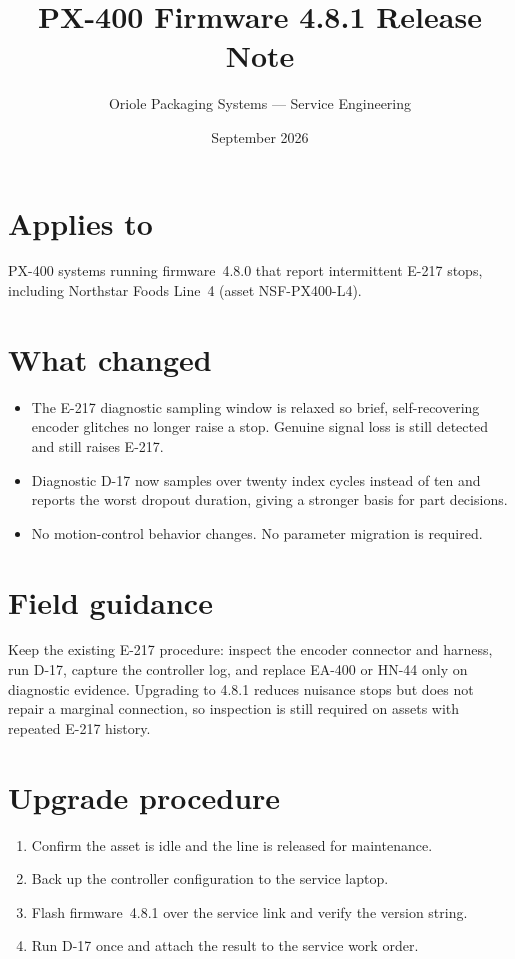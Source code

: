 \documentclass[11pt,a4paper]{article}
\title{PX-400 Firmware 4.8.1 Release Note}
\author{Oriole Packaging Systems --- Service Engineering}
\date{September 2026}
\begin{document}
\maketitle

\section{Applies to}
PX-400 systems running firmware~4.8.0 that report intermittent E-217 stops,
including Northstar Foods Line~4 (asset NSF-PX400-L4).

\section{What changed}
\begin{itemize}[leftmargin=*]
\item The E-217 diagnostic sampling window is relaxed so brief, self-recovering
encoder glitches no longer raise a stop. Genuine signal loss is still detected
and still raises E-217.
\item Diagnostic D-17 now samples over twenty index cycles instead of ten and
reports the worst dropout duration, giving a stronger basis for part decisions.
\item No motion-control behavior changes. No parameter migration is required.
\end{itemize}

\section{Field guidance}
Keep the existing E-217 procedure: inspect the encoder connector and harness,
run D-17, capture the controller log, and replace EA-400 or HN-44 only on
diagnostic evidence. Upgrading to 4.8.1 reduces nuisance stops but does not
repair a marginal connection, so inspection is still required on assets with
repeated E-217 history.

\section{Upgrade procedure}
\begin{enumerate}[leftmargin=*]
\item Confirm the asset is idle and the line is released for maintenance.
\item Back up the controller configuration to the service laptop.
\item Flash firmware~4.8.1 over the service link and verify the version string.
\item Run D-17 once and attach the result to the service work order.
\end{enumerate}
\end{document}
